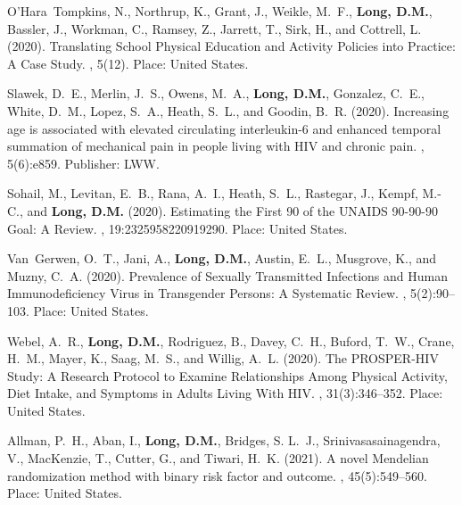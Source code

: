 \begin{thebibliography}{}
O'Hara~Tompkins, N., Northrup, K., Grant, J., Weikle, M.~F., \textbf{Long, D.M.}, Bassler,
  J., Workman, C., Ramsey, Z., Jarrett, T., Sirk, H., and Cottrell, L. (2020).
\newblock Translating {School} {Physical} {Education} and {Activity} {Policies}
  into {Practice}: {A} {Case} {Study}.
, 5(12).
\newblock Place: United States.

Slawek, D.~E., Merlin, J.~S., Owens, M.~A., \textbf{Long, D.M.}, Gonzalez, C.~E.,
  White, D.~M., Lopez, S.~A., Heath, S.~L., and Goodin, B.~R. (2020).
\newblock Increasing age is associated with elevated circulating interleukin-6
  and enhanced temporal summation of mechanical pain in people living with
  {HIV} and chronic pain.
, 5(6):e859.
\newblock Publisher: LWW.

Sohail, M., Levitan, E.~B., Rana, A.~I., Heath, S.~L., Rastegar, J., Kempf,
  M.-C., and \textbf{Long, D.M.} (2020).
\newblock Estimating the {First} 90 of the {UNAIDS} 90-90-90 {Goal}: {A}
  {Review}.
, 19:2325958220919290.
\newblock Place: United States.

Van~Gerwen, O.~T., Jani, A., \textbf{Long, D.M.}, Austin, E.~L., Musgrove, K., and
  Muzny, C.~A. (2020).
\newblock Prevalence of {Sexually} {Transmitted} {Infections} and {Human}
  {Immunodeficiency} {Virus} in {Transgender} {Persons}: {A} {Systematic}
  {Review}.
, 5(2):90--103.
\newblock Place: United States.

Webel, A.~R., \textbf{Long, D.M.}, Rodriguez, B., Davey, C.~H., Buford, T.~W., Crane,
  H.~M., Mayer, K., Saag, M.~S., and Willig, A.~L. (2020).
\newblock The {PROSPER}-{HIV} {Study}: {A} {Research} {Protocol} to {Examine}
  {Relationships} {Among} {Physical} {Activity}, {Diet} {Intake}, and
  {Symptoms} in {Adults} {Living} {With} {HIV}.
,
  31(3):346--352.
\newblock Place: United States.

Allman, P.~H., Aban, I., \textbf{Long, D.M.}, Bridges, S. L.~J., Srinivasasainagendra,
  V., MacKenzie, T., Cutter, G., and Tiwari, H.~K. (2021).
\newblock A novel {Mendelian} randomization method with binary risk factor and
  outcome.
, 45(5):549--560.
\newblock Place: United States.


\end{thebibliography}

